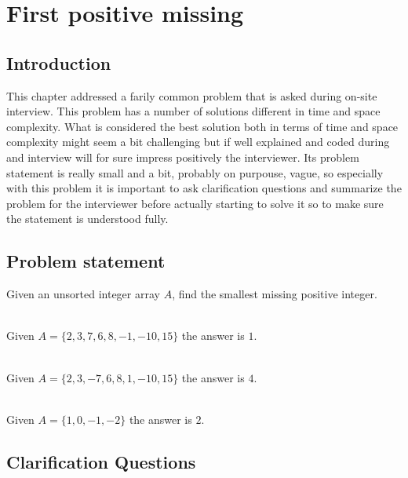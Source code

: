 %

\chapter{First positive missing}
\label{ch:first_positive_missing}
\section*{Introduction}
This chapter addressed a farily common problem that is asked during on-site interview. This problem has a number of solutions different in time and space complexity. What is considered the best solution both in terms of time and space complexity might seem a bit challenging but if well explained and coded during and interview will for sure impress positively the interviewer. 
Its problem statement is really small and a bit, probably on purpouse, vague, so especially with this problem it is important to ask clarification questions and summarize the problem for the interviewer before actually starting to solve it so to make sure the statement is understood fully.

\section{Problem statement}
\begin{exercise}
	Given an unsorted integer array $A$, find the smallest missing positive integer.
\end{exercise}


\begin{example}
	\hfill \\
	Given $A=\{2, 3, 7, 6, 8, -1, -10, 15\}$ the answer is $1$.
\end{example}

\begin{example}
	\hfill \\
	Given $A=\{ 2, 3, -7, 6, 8, 1, -10, 15\}$ the answer is $4$.
\end{example}

\begin{example}
	\hfill \\
	Given $A=\{ 1, 0, -1, -2\}$ the answer is $2$.
\end{example}

\section{Clarification Questions}

